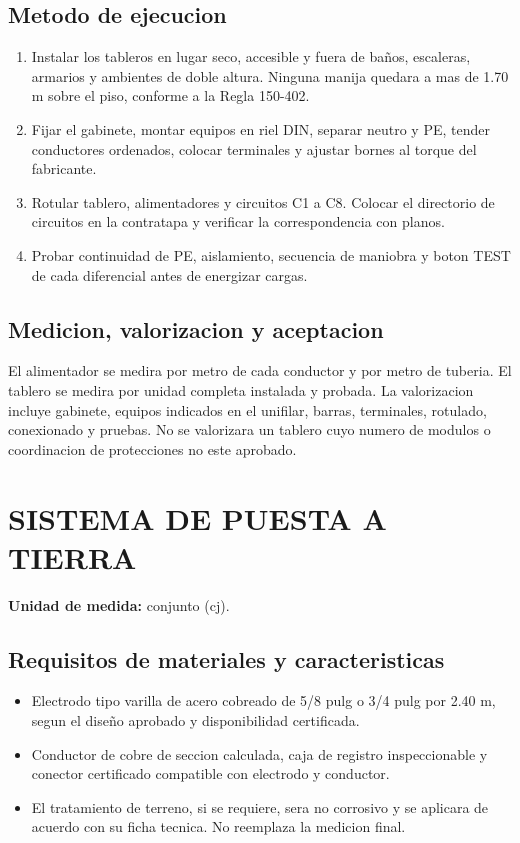 \subsection{Metodo de ejecucion}
\begin{enumerate}
  \item Instalar los tableros en lugar seco, accesible y fuera de baños, escaleras,
  armarios y ambientes de doble altura. Ninguna manija quedara a mas de 1.70 m sobre el
  piso, conforme a la Regla 150-402.
  \item Fijar el gabinete, montar equipos en riel DIN, separar neutro y PE, tender
  conductores ordenados, colocar terminales y ajustar bornes al torque del fabricante.
  \item Rotular tablero, alimentadores y circuitos C1 a C8. Colocar el directorio de
  circuitos en la contratapa y verificar la correspondencia con planos.
  \item Probar continuidad de PE, aislamiento, secuencia de maniobra y boton TEST de
  cada diferencial antes de energizar cargas.
\end{enumerate}

\subsection{Medicion, valorizacion y aceptacion}
El alimentador se medira por metro de cada conductor y por metro de tuberia. El tablero
se medira por unidad completa instalada y probada. La valorizacion incluye gabinete,
equipos indicados en el unifilar, barras, terminales, rotulado, conexionado y pruebas.
No se valorizara un tablero cuyo numero de modulos o coordinacion de protecciones no
este aprobado.

\section{SISTEMA DE PUESTA A TIERRA}

\textbf{Unidad de medida:} conjunto (cj).

\subsection{Requisitos de materiales y caracteristicas}
\begin{itemize}
  \item Electrodo tipo varilla de acero cobreado de 5/8 pulg o 3/4 pulg por 2.40 m,
  segun el diseño aprobado y disponibilidad certificada.
  \item Conductor de cobre de seccion calculada, caja de registro inspeccionable y
  conector certificado compatible con electrodo y conductor.
  \item El tratamiento de terreno, si se requiere, sera no corrosivo y se aplicara de
  acuerdo con su ficha tecnica. No reemplaza la medicion final.
\end{itemize}

